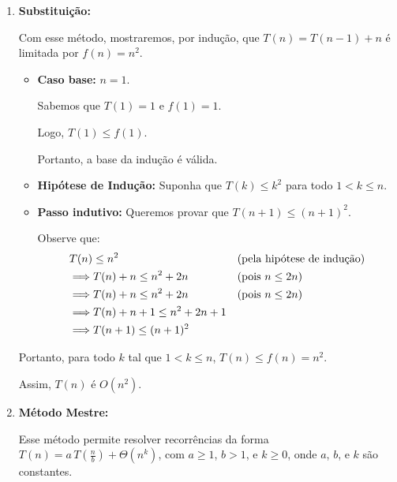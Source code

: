 \begin{enumerate}
	\item \textbf{Substituição:}

	      Com esse método, mostraremos, por indução, que \( T(n) = T(n-1) + n \) é limitada por \( f(n) = n^2 \).

	      \begin{itemize}
		      \item \textbf{Caso base:} \( n = 1 \).

		            Sabemos que \( T(1) = 1 \) e \( f(1) = 1 \).

		            Logo, \( T(1) \leq f(1) \).

		            Portanto, a base da indução é válida.

		      \item \textbf{Hipótese de Indução:} Suponha que \( T(k) \leq k^2 \) para todo \( 1 < k \leq n \).

		      \item \textbf{Passo indutivo:} Queremos provar que \( T(n+1) \leq (n+1)^2 \).

		            Observe que:
		            \begin{align*}
			             & T(n) \leq n^2                                  &  & \text{(pela hipótese de indução)} \\
			             & \Longrightarrow T(n) + n \leq n^2 + 2n         &  & \text{(pois \( n \leq 2n \))}     \\
			             & \Longrightarrow T(n) + n \leq n^2 + 2n         &  & \text{(pois \( n \leq 2n \))}     \\
			             & \Longrightarrow T(n) + n + 1 \leq n^2 + 2n + 1                                        \\
			             & \Longrightarrow T(n+1) \leq (n+1)^2
		            \end{align*}
	      \end{itemize}

	      Portanto, para todo \( k \) tal que \( 1 < k \leq n \), \( T(n) \leq f(n) = n^2 \).

	      Assim, \( T(n) \) é \( O(n^2) \).

	\item \textbf{Método Mestre:}

	      Esse método permite resolver recorrências da forma \( T(n) = a \, T\left(\frac{n}{b}\right) + \Theta(n^k) \), com \( a \geq 1 \), \( b > 1 \), e \( k \geq 0 \), onde \( a \), \( b \), e \( k \) são constantes.


\end{enumerate}
